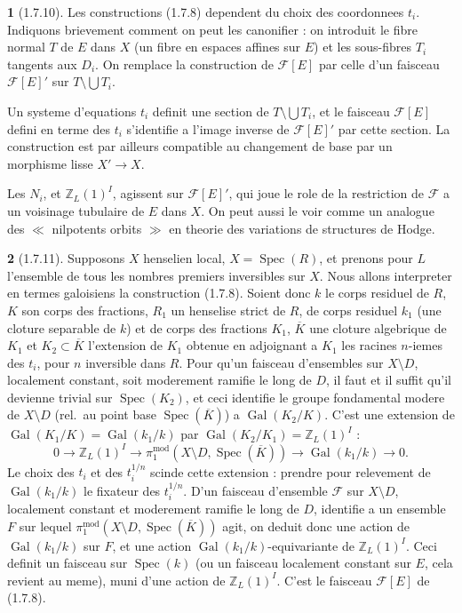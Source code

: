 \documentclass[12pt,a4paper]{article}
\theoremstyle{plain}
\theoremstyle{definition}
\theoremstyle{definition}
\newtheorem{para}{}[section]
\theoremstyle{remark}
\DeclareMathOperator{\Gal}{Gal}
\DeclareMathOperator{\Spec}{Spec}
\begin{document}
\begin{para}[1.7.10]
Les constructions (1.7.8) dependent du choix des coordonnees $t_i$. Indiquons brievement comment on peut les canonifier : on introduit le fibre normal $T$ de $E$ dans $X$ (un fibre en espaces affines sur $E$) et les sous-fibres $T_i$ tangents aux $D_i$. On remplace la construction de $\mathscr{F}[E]$ par celle d'un faisceau $\mathscr{F}[E]'$ sur $T \setminus \bigcup T_i$.

Un systeme d'equations $t_i$ definit une section de $T \setminus \bigcup T_i$, et le faisceau $\mathscr{F}[E]$ defini en terme des $t_i$ s'identifie a l'image inverse de $\mathscr{F}[E]'$ par cette section. La construction est par ailleurs compatible au changement de base par un morphisme lisse $X' \to X$.

Les $N_i$, et $\mathbb{Z}_L(1)^I$, agissent sur $\mathscr{F}[E]'$, qui joue le role de la restriction de $\mathscr{F}$ a un voisinage tubulaire de $E$ dans $X$. On peut aussi le voir comme un analogue des $\ll$ nilpotents orbits $\gg$ en theorie des variations de structures de Hodge.
\end{para}

\begin{para}[1.7.11]
Supposons $X$ henselien local, $X = \Spec(R)$, et prenons pour $L$ l'ensemble de tous les nombres premiers inversibles sur $X$. Nous allons interpreter en termes galoisiens la construction (1.7.8). Soient donc $k$ le corps residuel de $R$, $K$ son corps des fractions, $R_1$ un henselise strict de $R$, de corps residuel $k_1$ (une cloture separable de $k$) et de corps des fractions $K_1$, $\overline{K}$ une cloture algebrique de $K_1$ et $K_2 \subset \overline{K}$ l'extension de $K_1$ obtenue en adjoignant a $K_1$ les racines $n$-iemes des $t_i$, pour $n$ inversible dans $R$. Pour qu'un faisceau d'ensembles sur $X \setminus D$, localement constant, soit moderement ramifie le long de $D$, il faut et il suffit qu'il devienne trivial sur $\Spec(K_2)$, et ceci identifie le groupe fondamental modere de $X \setminus D$ (rel.~au point base $\Spec(\overline{K})$) a $\Gal(K_2/K)$. C'est une extension de $\Gal(K_1/K) = \Gal(k_1/k)$ par $\Gal(K_2/K_1) = \mathbb{Z}_L(1)^I$ :
\[0 \to \mathbb{Z}_L(1)^I \to \pi_1^{\text{mod}}(X \setminus D, \Spec(\overline{K})) \to \Gal(k_1/k) \to 0.\]
Le choix des $t_i$ et des $t_i^{1/n}$ scinde cette extension : prendre pour relevement de $\Gal(k_1/k)$ le fixateur des $t_i^{1/n}$. D'un faisceau d'ensemble $\mathscr{F}$ sur $X \setminus D$, localement constant et moderement ramifie le long de $D$, identifie a un ensemble $F$ sur lequel $\pi_1^{\text{mod}}(X \setminus D, \Spec(\overline{K}))$ agit, on deduit donc une action de $\Gal(k_1/k)$ sur $F$, et une action $\Gal(k_1/k)$-equivariante de $\mathbb{Z}_L(1)^I$. Ceci definit un faisceau sur $\Spec(k)$ (ou un faisceau localement constant sur $E$, cela revient au meme), muni d'une action de $\mathbb{Z}_L(1)^I$. C'est le faisceau $\mathscr{F}[E]$ de (1.7.8).
\end{para}
\end{document}
